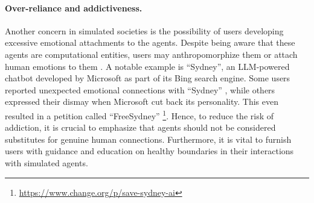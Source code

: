 \paragraph{Over-reliance and addictiveness.}
Another concern in simulated societies is the possibility of users developing excessive emotional attachments to the agents.
Despite being aware that these agents are computational entities, users may anthropomorphize them or attach human emotions to them \cite{DBLP:journals/corr/abs-2304-03442, DBLP:books/daglib/0085601}.
A notable example is ``Sydney'', an LLM-powered chatbot developed by Microsoft as part of its Bing search engine.
Some users reported unexpected emotional connections with ``Sydney'' \cite{roose2023conversation}, while others expressed their dismay when Microsoft cut back its personality. 
This even resulted in a petition called ``FreeSydney'' \footnote{\href{https://www.change.org/p/save-sydney-ai}{https://www.change.org/p/save-sydney-ai}}.
Hence, to reduce the risk of addiction, it is crucial to emphasize that agents should not be considered substitutes for genuine human connections.
Furthermore, it is vital to furnish users with guidance and education on healthy boundaries in their interactions with simulated agents. 